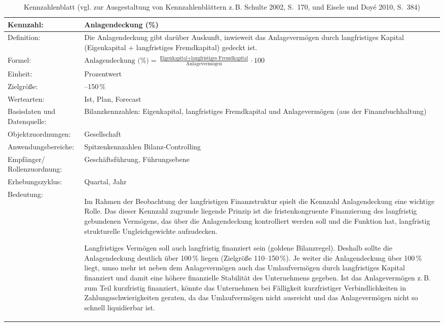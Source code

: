 \begin{table}[htbp]
  \centering
  \caption[Kennzahlenblatt]{Kennzahlenblatt (vgl. zur Ausgestaltung von Kennzahlenblättern z.\,B. Schulte 2002, S.~170, und Eisele und Doyé 2010, S.~384)}
  \label{tab:Kennzahlenblatt}
  \small
  \begin{tabularx}{\textwidth}{@{}>{\raggedright\arraybackslash}p{3.3cm}>{\raggedright\arraybackslash}X@{}}
    \toprule
    \textbf{Kennzahl:} & \textbf{Anlagendeckung (\%)} \\
    \midrule
    Definition: & Die Anlagendeckung gibt darüber Auskunft, inwieweit das Anlagevermögen durch langfristiges Kapital (Eigenkapital + langfristiges Fremdkapital) gedeckt ist. \\
    \addlinespace
    Formel: & $\displaystyle \text{Anlagendeckung (\%)} = \frac{\text{Eigenkapital} + \text{langfristiges Fremdkapital}}{\text{Anlagevermögen}} \cdot 100$ \\
    \addlinespace
    Einheit: & Prozentwert \\
    Zielgröße: & 110--150\,\% \\
    Wertearten: & Ist, Plan, Forecast \\
    Basisdaten und Datenquelle: & Bilanzkennzahlen: Eigenkapital, langfristiges Fremdkapital und Anlagevermögen (aus der Finanzbuchhaltung) \\
    Objektzuordnungen: & Gesellschaft \\
    Anwendungsbereiche: & Spitzenkennzahlen Bilanz-Controlling \\
    Empfänger/ Rollenzuordnung: & Geschäftsführung, Führungsebene \\
    Erhebungszyklus: & Quartal, Jahr \\
    \addlinespace
    Bedeutung: & Im Rahmen der Beobachtung der langfristigen Finanzstruktur spielt die Kennzahl Anlagendeckung eine wichtige Rolle. Das dieser Kennzahl zugrunde liegende Prinzip ist die fristenkongruente Finanzierung des langfristig gebundenen Vermögens, das über die Anlagendeckung kontrolliert werden soll und die Funktion hat, langfristig strukturelle Ungleichgewichte aufzudecken.

    Langfristiges Vermögen soll auch langfristig finanziert sein (goldene Bilanzregel). Deshalb sollte die Anlagendeckung deutlich über 100\,\% liegen (Zielgröße 110--150\,\%). Je weiter die Anlagendeckung über 100\,\% liegt, umso mehr ist neben dem Anlagevermögen auch das Umlaufvermögen durch langfristiges Kapital finanziert und damit eine höhere finanzielle Stabilität des Unternehmens gegeben. Ist das Anlagevermögen z.\,B. zum Teil kurzfristig finanziert, könnte das Unternehmen bei Fälligkeit kurzfristiger Verbindlichkeiten in Zahlungsschwierigkeiten geraten, da das Umlaufvermögen nicht ausreicht und das Anlagevermögen nicht so schnell liquidierbar ist. \\
    \bottomrule
  \end{tabularx}
\end{table}
